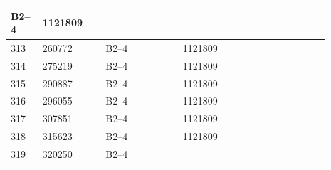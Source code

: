 \documentclass[UTF8,10pt,a4paper,fontset=fandol]{ctexart}
\newcommand{\fieldvalue}[1]{#1}
\begin{document}
\begin{center}
\begin{tabular}{|p{0.07\linewidth}|p{0.18\linewidth}|p{0.22\linewidth}|p{0.22\linewidth}|p{0.20\linewidth}|}
\fieldvalue{B2--4} &
\fieldvalue{1121809} & \\ \hline
\fieldvalue{313} &
\fieldvalue{260772} &
\fieldvalue{B2--4} &
\fieldvalue{1121809} & \\ \hline
\fieldvalue{314} &
\fieldvalue{275219} &
\fieldvalue{B2--4} &
\fieldvalue{1121809} & \\ \hline
\fieldvalue{315} &
\fieldvalue{290887} &
\fieldvalue{B2--4} &
\fieldvalue{1121809} & \\ \hline
\fieldvalue{316} &
\fieldvalue{296055} &
\fieldvalue{B2--4} &
\fieldvalue{1121809} & \\ \hline
\fieldvalue{317} &
\fieldvalue{307851} &
\fieldvalue{B2--4} &
\fieldvalue{1121809} & \\ \hline
\fieldvalue{318} &
\fieldvalue{315623} &
\fieldvalue{B2--4} &
\fieldvalue{1121809} & \\ \hline
\fieldvalue{319} &
\fieldvalue{320250} &
\fieldvalue{B2--4} &

\end{tabular}
\end{center}
\end{document}
